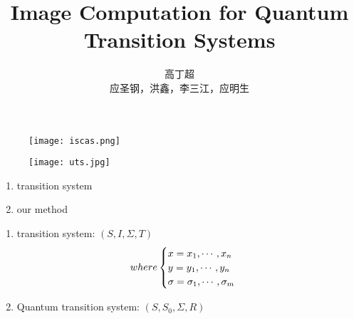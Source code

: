 \documentclass[aspectratio=1610,18pt]{ctexbeamer}
\title[TDD in quantum]{Image Computation for Quantum Transition Systems}
\author{高丁超\\ 应圣钢，洪鑫，李三江，应明生}
\begin{document}
\begin{frame}[plain]
  \titlepage
  \begin{figure}
    \centering
    \begin{minipage}[t]{0.48\textwidth}
    \centering
    \texttt{[image: iscas.png]}
    \end{minipage}
    \begin{minipage}[t]{0.48\textwidth}
    \centering
    \texttt{[image: uts.jpg]}
    \end{minipage}
  \end{figure}
\end{frame}
\begin{frame}
  \begin{enumerate}
    \Large
    \item transition system
    \item our method
  \end{enumerate}
\end{frame}
\begin{frame}
  \begin{enumerate}
    \Large
    \item  transition system: $(S, I, \Sigma, T)$
    \begin{equation}
      where
      \begin{cases}
        x = x_1, \cdots, x_n\\
        y = y_1, \cdots, y_n\\
        \sigma = \sigma_1, \cdots, \sigma_m
      \end{cases}
      \notag
    \end{equation}
    \item Quantum transition system: $(S, S_0, \Sigma, R)$
  \end{enumerate}
\end{frame}
\end{document}
